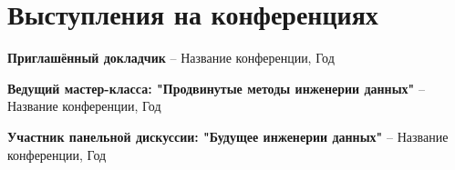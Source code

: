 \section{Выступления на конференциях}

\begin{cvitems}
  \item {\textbf{Приглашённый докладчик} -- Название конференции, Год}
  \item {\textbf{Ведущий мастер-класса: "Продвинутые методы инженерии данных"} -- Название конференции, Год}
  \item {\textbf{Участник панельной дискуссии: "Будущее инженерии данных"} -- Название конференции, Год}
\end{cvitems}